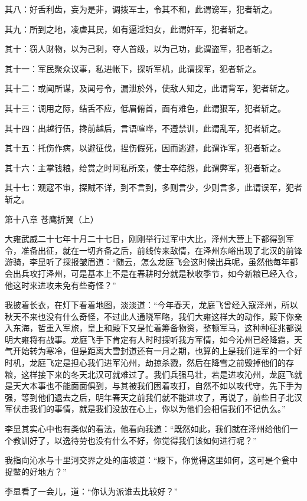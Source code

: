 其八：好舌利齿，妄为是非，调拨军士，令其不和，此谓谤军，犯者斩之。

其九：所到之地，凌虐其民，如有逼淫妇女，此谓奸军，犯者斩之。

其十：窃人财物，以为己利，夺人首级，以为己功，此谓盗军，犯者斩之。

其十一：军民聚众议事，私进帐下，探听军机，此谓探军，犯者斩之。

其十二：或闻所谋，及闻号令，漏泄於外，使敌人知之，此谓背军，犯者斩之。

其十三：调用之际，结舌不应，低眉俯首，面有难色，此谓狠军，犯者斩之。

其十四：出越行伍，搀前越后，言语喧哗，不遵禁训，此谓乱军，犯者斩之。

其十五：托伤作病，以避征伐，捏伤假死，因而逃避，此谓诈军，犯者斩之。

其十六：主掌钱粮，给赏之时阿私所亲，使士卒结怨，此谓弊军，犯者斩之。

其十七：观寇不审，探贼不详，到不言到，多则言少，少则言多，此谓误军，犯者斩之。

第十八章    苍鹰折翼（上）

大雍武威二十七年十月二十七日，刚刚举行过军中大比，泽州大营上下都得到军令，准备出征，就在一切齐备之后，前线传来敌情，在泽州东峪出现了北汉的前锋游骑，李显听了探报皱眉道：“随云，怎么龙庭飞会这时候出兵呢，虽然他每年都会出兵攻打泽州，可是基本上不是在春耕时分就是秋收季节，如今新粮已经入仓，他这时来进攻未免有些奇怪？”

我披着长衣，在灯下看着地图，淡淡道：“今年春天，龙庭飞曾经入寇泽州，所以秋天不来也没有什么奇怪，不过此人通晓军略，我们大雍这样大的动作，殿下你亲入东海，哲重入军旅，皇上和殿下又是忙着筹备物资，整顿军马，这种种征兆都说明大雍将有战事。龙庭飞手下肯定有人时时探听我方军情，如今沁州已经降霜，天气开始转为寒冷，但是距离大雪封道还有一月之期，也算的上是我们进军的一个好时机，龙庭飞定是担心我们进军沁州，劫掠杀戮，然后在降雪之前毁掉他们的存粮，这样接下来的冬天北汉可就难过了。我们兵强马壮，若是进攻沁州，龙庭飞就是天大本事也不能面面俱到，与其被我们困着攻打，自然不如以攻代守，先下手为强，等到他们退去之后，明年春天之前我们就不能进攻了，再说了，前些日子北汉军伏击我们的事情，就是我们没放在心上，你以为他们会相信我们不记仇么。”

李显其实心中也有类似的看法，他看向我道：“既然如此，我们就在泽州给他们一个教训好了，以逸待劳也没有什么不好，你觉得我们该如何进行呢？”

我指向沁水与十里河交界之处的庙坡道：“殿下，你觉得这里如何，这可是个瓮中捉鳖的好地方？”

李显看了一会儿，道：“你认为派谁去比较好？”

